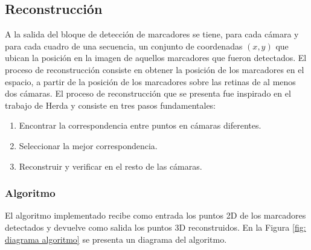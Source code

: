 \subsection{Reconstrucción}
A la salida del bloque de detección de marcadores se tiene, para cada cámara y para cada cuadro de una secuencia, un conjunto de coordenadas $(x,y)$ que ubican la posición en la imagen de aquellos marcadores que fueron detectados.
El proceso de reconstrucción consiste en obtener la posición de los marcadores en el espacio, a partir de la posición de los marcadores sobre las retinas de al menos dos cámaras.
%
%
El proceso de reconstrucción que se presenta fue inspirado en el trabajo de Herda y consiste en tres pasos fundamentales:

\begin{enumerate}
\item Encontrar la correspondencia entre puntos en cámaras diferentes.
\item Seleccionar la mejor correspondencia.
\item Reconstruir y verificar en el resto de las cámaras.
\end{enumerate}

\subsubsection{Algoritmo}
El algoritmo implementado recibe como entrada los puntos 2D de los marcadores detectados y devuelve como salida los puntos 3D reconstruidos. 
En la Figura \ref{fig: diagrama algoritmo} se presenta un diagrama del algoritmo.

